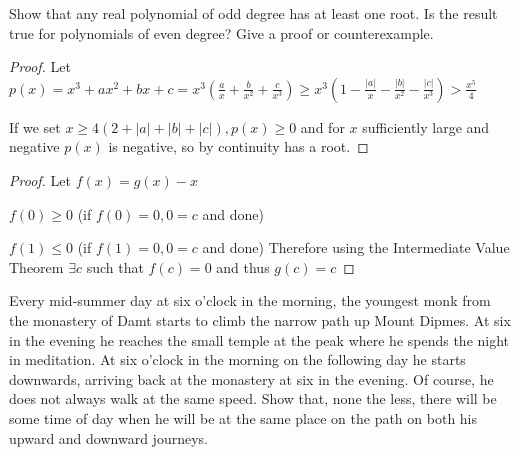 \begin{problem}
Show that any real polynomial of odd degree has at least one root. Is the result true for polynomials of even degree? Give a proof or counterexample.
\end{problem}

\begin{proof}
Let $p(x) = x^3 + ax^2 + bx + c = x^3(\frac{a}{x} + \frac{b}{x^2} + \frac{c}{x^3}) \geq x^3 (1 - \frac{|a|}{x} - \frac{|b|}{x^2} - \frac{|c|}{x^3}) > \frac{x^5}{4}$

If we set $x \geq 4(2 + |a| + |b| + |c|), p(x) \geq 0$ and for $x$ sufficiently large and negative $p(x)$ is negative, so by continuity has a root.
\end{proof}


\begin{proof}
Let $f(x) = g(x) - x$

$f(0) $ (if $f(0) = 0, 0 = c$ and done)

$f(1) $ (if $f(1) = 0, 0 = c$ and done)
Therefore using the Intermediate Value Theorem $\exists c$ such that $f(c) = 0$ and thus $g(c) = c$
\end{proof}

\begin{problem}
Every mid-summer day at six o'clock in the morning, the youngest monk from the monastery of Damt starts to climb the narrow path up Mount Dipmes. At six in the evening he reaches the small temple at the peak where he spends the night in meditation. At six o'clock in the morning on the following day he starts downwards, arriving back at the monastery at six in the evening. Of course, he does not always walk at the same speed. Show that, none the less, there will be some time of day when he will be at the same place on the path on both his upward and downward journeys.
\end{problem}





